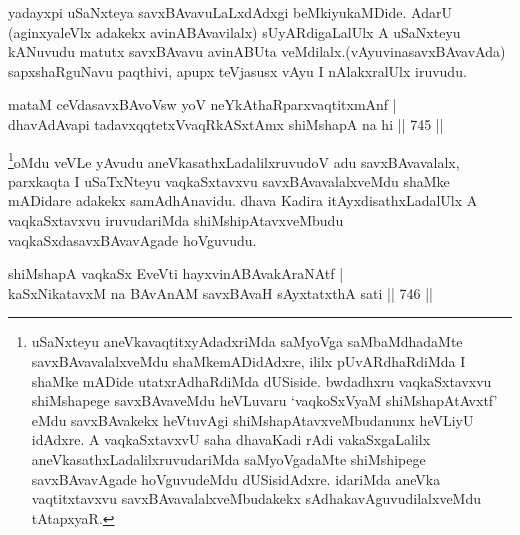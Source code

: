 \begin{artha}
yadayxpi uSaNxteya savxBAvavuLaLxdAdxgi beMkiyukaMDide. AdarU (aginxyaleVlx adakekx avinABAvavilalx) sUyARdigaLalUlx A uSaNxteyu kANuvudu matutx savxBAvavu avinABUta veMdilalx.(vAyuvinasavxBAvavAda) sapxshaRguNavu paqthivi, apupx teVjasusx vAyu I nAlakxralUlx iruvudu.
\end{artha}


\begin{shl}
mataM ceVdasavxBAvoV\s sw yoV neYkAthaRparxvaqtitxmAnf | \\
dhavAdAvapi tadavxqqtetxVvaqRkASxtAmx shiMshapA na hi \hfill||  745 ||  
\end{shl}

\begin{artha}
\footnote{uSaNxteyu aneVkavaqtitxyAdadxriMda saMyoVga saMbaMdhadaMte savxBAvavalalxveMdu shaMkemADidAdxre, ililx pUvARdhaRdiMda I shaMke mADide utatxrAdhaRdiMda dUSiside. bwdadhxru vaqkaSxtavxvu shiMshapege savxBAvaveMdu heVLuvaru `vaqkoSxV\s yaM shiMshapAtAvxtf' eMdu savxBAvakekx heVtuvAgi shiMshapAtavxveMbudanunx heVLiyU idAdxre. A vaqkaSxtavxvU saha dhavaKadi rAdi vakaSxgaLalilx aneVkasathxLadalilxruvudariMda saMyoVgadaMte shiMshipege savxBAvavAgade hoVguvudeMdu dUSisidAdxre. idariMda aneVka vaqtitxtavxvu savxBAvavalalxveMbudakekx sAdhakavAguvudilalxveMdu tAtapxyaR.}oMdu veVLe yAvudu aneVkasathxLadalilxruvudoV adu savxBAvavalalx, parxkaqta I uSaTxNteyu vaqkaSxtavxvu savxBAvavalalxveMdu shaMke mADidare adakekx samAdhAnavidu. dhava Kadira itAyxdisathxLadalUlx A vaqkaSxtavxvu iruvudariMda shiMshipAtavxveMbudu vaqkaSxdasavxBAvavAgade hoVguvudu.
\end{artha}


\begin{shl}
shiMshapA vaqkaSx EveVti hayxvinABAvakAraNAtf | \\
kaSxNikatavxM na BAvAnAM savxBAvaH sAyxtatxthA  sati \hfill||  746 || 
\end{shl}

